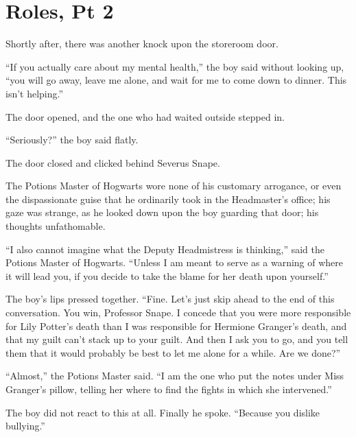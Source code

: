 \chapter{Roles, Pt 2}

Shortly after, there was another knock upon the storeroom door.

``If you actually care about my mental health,'' the boy said without
looking up, ``you will go away, leave me alone, and wait for me to come
down to dinner. This isn't helping.''

The door opened, and the one who had waited outside stepped in.

``Seriously?'' the boy said flatly.

The door closed and clicked behind Severus Snape.

The Potions Master of Hogwarts wore none of his customary arrogance, or
even the dispassionate guise that he ordinarily took in the Headmaster's
office; his gaze was strange, as he looked down upon the boy guarding
that door; his thoughts unfathomable.

``I also cannot imagine what the Deputy Headmistress is thinking,'' said
the Potions Master of Hogwarts. ``Unless I am meant to serve as a
warning of where it will lead you, if you decide to take the blame for
her death upon yourself.''

The boy's lips pressed together. ``Fine. Let's just skip ahead to the
end of this conversation. You win, Professor Snape. I concede that you
were more responsible for Lily Potter's death than I was responsible for
Hermione Granger's death, and that my guilt can't stack up to your
guilt. And then I ask you to go, and you tell them that it would
probably be best to let me alone for a while. Are we done?''

``Almost,'' the Potions Master said. ``I am the one who put the notes
under Miss Granger's pillow, telling her where to find the fights in
which she intervened.''

The boy did not react to this at all. Finally he spoke. ``Because you
dislike bullying.''

